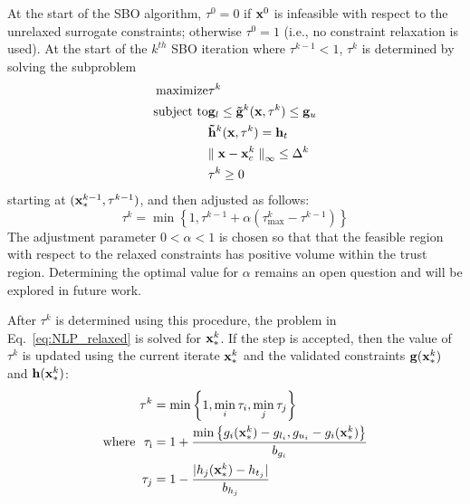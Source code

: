 At the start of the SBO algorithm, $\tau^0=0$ if ${\bf x}^0$ is
infeasible with respect to the unrelaxed surrogate constraints;
otherwise $\tau^0=1$ (i.e., no constraint relaxation is used).  At the
start of the $k^{th}$ SBO iteration where $\tau^{k-1} < 1$, $\tau^k$
is determined by solving the subproblem
\begin{eqnarray}
{\rm maximize } & \tau^k \nonumber \\
{\rm subject\  to } 
  & {\bf g}_l \le {\bf {\tilde g}}^k({\bf x},\tau^k) \le {\bf g}_u \nonumber \\
  &               {\bf {\tilde h}}^k({\bf x},\tau^k) = {\bf h}_t \nonumber \\
  & {\parallel {\bf x} - {\bf x}^k_c \parallel}_\infty \le \Delta^k \nonumber\\
  & \tau^k \ge 0 \label{eq:tau_max}
\end{eqnarray}
starting at $({\bf x}^{k-1}_*, \tau^{k-1})$, and then adjusted as follows:
\begin{equation}
\tau^k = \min\left\{1,\tau^{k-1} + \alpha
\left(\tau^{k}_{\max}-\tau^{k-1}\right)\right\}
\end{equation}
The adjustment parameter $0 < \alpha < 1$ is chosen so that that the
feasible region with respect to the relaxed constraints has positive
volume within the trust region.  Determining the optimal value for
$\alpha$ remains an open question and will be explored in future work.

After $\tau^k$ is determined using this procedure, the problem in
Eq.~\ref{eq:NLP_relaxed} is solved for ${\bf x}^k_\ast$.
If the step is accepted, then the value of $\tau^k$ is 
updated using the current iterate ${\bf x}^k_\ast$ and the validated
constraints ${\bf g}({\bf x}^k_\ast)$ and ${\bf h}({\bf x}^k_\ast)$:
\begin{eqnarray}
\tau^{k} & = \min\left\{1,\min_i \tau_i , \min_j \tau_j \right\} \\
\rm{where}~~
\tau_i & = 1 + \frac{\min \left\{g_i({\bf x}^k_\ast) - g_{l_{i}}, 
g_{u_{i}} - g_i({\bf x}^k_\ast)\right\}}{b_{g_{i}}} \\ 
\tau_j & = 1 - \frac{| h_j({\bf x}^k_\ast) - h_{t_{j}} |}{b_{h_{j}}}
\end{eqnarray}

